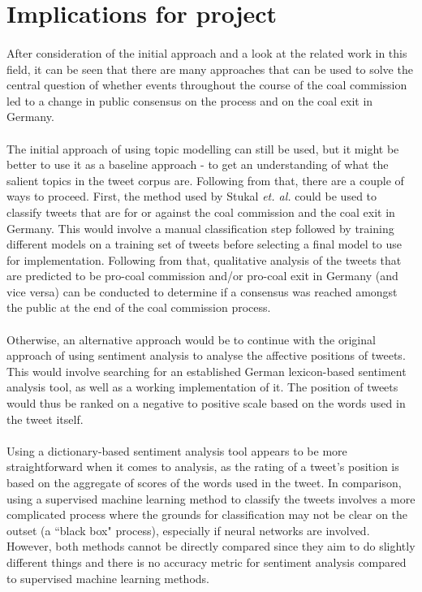 \documentclass[10pt,twocolumn,letterpaper]{article}
\begin{document}
	\section{Implications for project}
	\paragraph{} After consideration of the initial approach and a look at the related work in this field, it can be seen that there are many approaches that can be used to solve the central question of whether events throughout the course of the coal commission led to a change in public consensus on the process and on the coal exit in Germany. 
	
	\paragraph{} The initial approach of using topic modelling can still be used, but it might be better to use it as a baseline approach - to get an understanding of what the salient topics in the tweet corpus are.  Following from that, there are a couple of ways to proceed. First, the method used by Stukal \emph{et. al.} could be used to classify tweets that are for or against the coal commission and the coal exit in Germany. This would involve a manual classification step followed by training different models on a training set of tweets before selecting a final model to use for implementation. Following from that, qualitative analysis of the tweets that are predicted to be pro-coal commission and/or pro-coal exit in Germany (and vice versa) can be conducted to determine if a consensus was reached amongst the public at the end of the coal commission process. 
	
	\paragraph{} Otherwise, an alternative approach would be to continue with the original approach of using sentiment analysis to analyse the affective positions of tweets. This would involve searching for an established German lexicon-based sentiment analysis tool, as well as a working implementation of it. The position of tweets would thus be ranked on a negative to positive scale based on the words used in the tweet itself. 
	
	\paragraph{} Using a dictionary-based sentiment analysis tool appears to be more straightforward when it comes to analysis, as the rating of a tweet's position is based on the aggregate of scores of the words used in the tweet. In comparison, using a supervised machine learning method to classify the tweets involves a more complicated process where the grounds for classification may not be clear on the outset (a ``black box" process), especially if neural networks are involved. However, both methods cannot be directly compared since they aim to do slightly different things and there is no accuracy metric for sentiment analysis compared to supervised machine learning methods. 
	
\end{document}
